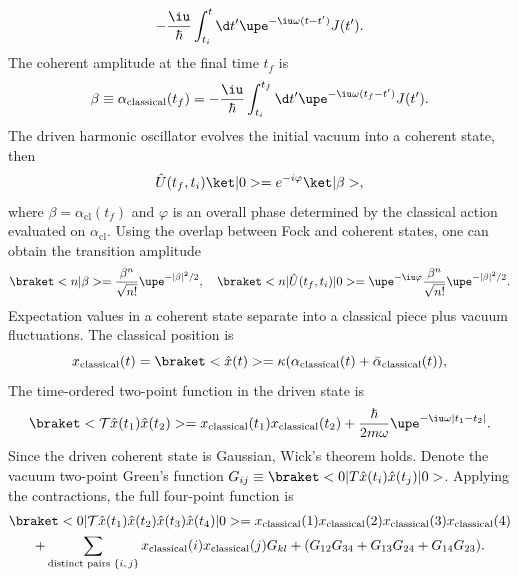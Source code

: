 \begin{solution}
\begin{enumext}
\[    -\frac\iu\hbar \int_{t_i}^{t} \d t' \upe^{-\iu\omega(t-t')} J(t').
    \]
    The coherent amplitude at the final time $t_f$ is
    \[
      \beta \equiv \alpha_\text{classical}(t_f)
    = -\frac\iu\hbar \int_{t_i}^{t_f} \d t' \upe^{-\iu\omega (t_f-t')} J(t').
    \]
    The driven harmonic oscillator evolves the initial vacuum into a coherent
    state, then
    \[
      \hat U(t_f,t_i)\ket|0> = e^{-i\varphi}\ket|\beta>,
    \]
    where $\beta=\alpha_{\mathrm{cl}}(t_f)$ and $\varphi$ is an overall phase
    determined by the classical action evaluated on $\alpha_{\mathrm{cl}}$.
    Using the overlap between Fock and coherent states, one can obtain the
    transition amplitude
    \[
      \braket<n|\beta>
    = \frac{\beta^n}{\sqrt{n!}} \upe^{-|\beta|^2/2}, \quad
      \braket<n|\hat U(t_f, t_i)|0>
    = \upe^{-\iu\varphi} \frac{\beta^n}{\sqrt{n!}} \upe^{-|\beta|^2/2}.
    \]
    Expectation values in a coherent state separate into a classical piece plus
    vacuum fluctuations. The classical position is
    \[
      x_\text{classical}(t) = \braket<\hat x(t)>
    = \kappa (\alpha_\text{classical}(t) + \bar \alpha_\text{classical}(t)),
    \]
    The time-ordered two-point function in the driven state is
    \[
      \braket<\mathcal T\hat x(t_1)\hat x(t_2)>
    = x_\text{classical}(t_1) x_\text{classical}(t_2)
      + \frac{\hbar}{2m\omega} \upe^{-\iu\omega|t_1-t_2|}.
    \]
    Since the driven coherent state is Gaussian, Wick's theorem holds.
    Denote the vacuum two-point Green's
    function $G_{ij} \equiv \braket<0|T\hat x(t_i)\hat x(t_j)|0>$.
    Applying the contractions, the full four-point function is
    \begin{multline*}
      \braket<0|\mathcal T \hat x(t_1) \hat x(t_2) \hat x(t_3) \hat x(t_4)|0>
    = x_\text{classical}(1) x_\text{classical}(2)
      x_\text{classical}(3) x_\text{classical}(4)\\
    + \sum_\text{distinct pairs $\{i,j\}$}
      x_\text{classical}(i) x_\text{classical}(j)
      G_{kl} + (G_{12}G_{34}+G_{13}G_{24}+G_{14}G_{23}).
    \end{multline*}
  \end{enumext}
\end{solution}

\clearpage

